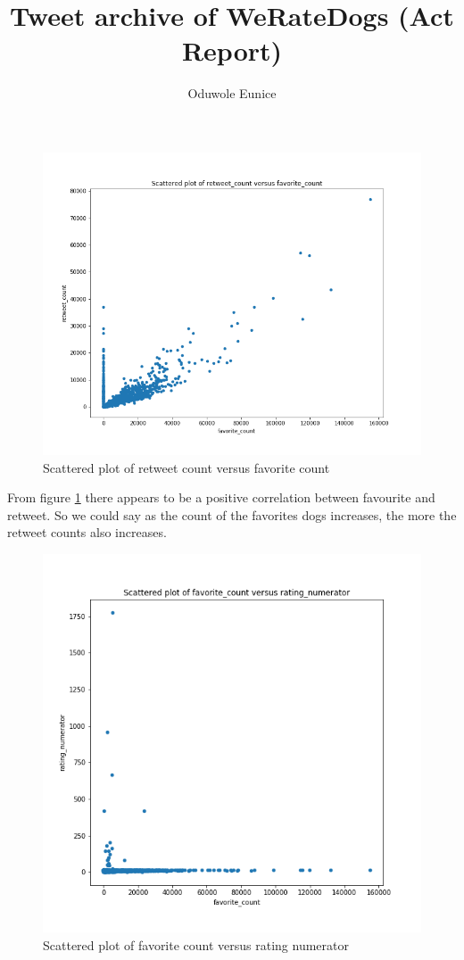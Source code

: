 \documentclass[10pt,a4paper]{article}
\author{Oduwole Eunice}
\title{ Tweet archive of  WeRateDogs (Act Report)}
\begin{document}
\maketitle

\begin{figure}[!h]
\includegraphics[scale=0.3]{twitter_archiveplot.png} 
\caption{Scattered plot of retweet count versus favorite count}
\label{fig1}
\end{figure}
\noindent From figure  \ref{fig1} there appears to be a positive correlation between favourite and retweet. So we could say as the count of the favorites dogs increases, the more the retweet counts also increases. 

\begin{figure}[!h]
\includegraphics[scale=0.3]{Scattered_numerator.png} 
\caption{Scattered plot of favorite count versus rating numerator}
\label{fig2}
\end{figure}
\end{document}
